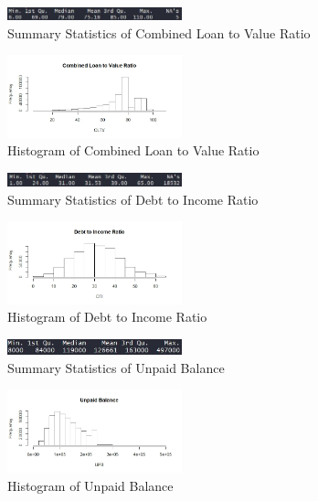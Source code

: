 \documentclass[10pt,twocolumn,letterpaper]{article}
\begin{document}
\begin{figure}
	\includegraphics[width=0.45\textwidth]{images/CLTVS.JPG}
	\caption{Summary Statistics of Combined Loan to Value Ratio}
	\label{fig:CLTVS}
\end{figure}
\begin{figure}
	\includegraphics[width=0.45\textwidth]{images/CLTVB.jpeg}
	\caption{Histogram of Combined Loan to Value Ratio}
	\label{fig:CLTVB}
\end{figure}

\begin{figure}
	\includegraphics[width=0.45\textwidth]{images/DTIS.JPG}
	\caption{Summary Statistics of Debt to Income Ratio}
	\label{fig:DTIS}
\end{figure}
\begin{figure}
	\includegraphics[width=0.45\textwidth]{images/DTIB.jpeg}
	\caption{Histogram of Debt to Income Ratio}
	\label{fig:DTIB}
\end{figure}

\begin{figure}
	\includegraphics[width=0.45\textwidth]{images/UPBS.JPG}
	\caption{Summary Statistics of Unpaid Balance}
	\label{fig:UPBS}
\end{figure}
\begin{figure}
	\includegraphics[width=0.45\textwidth]{images/UPBB.jpeg}
	\caption{Histogram of Unpaid Balance}
	\label{fig:UPBB}
\end{figure}
\end{document}
